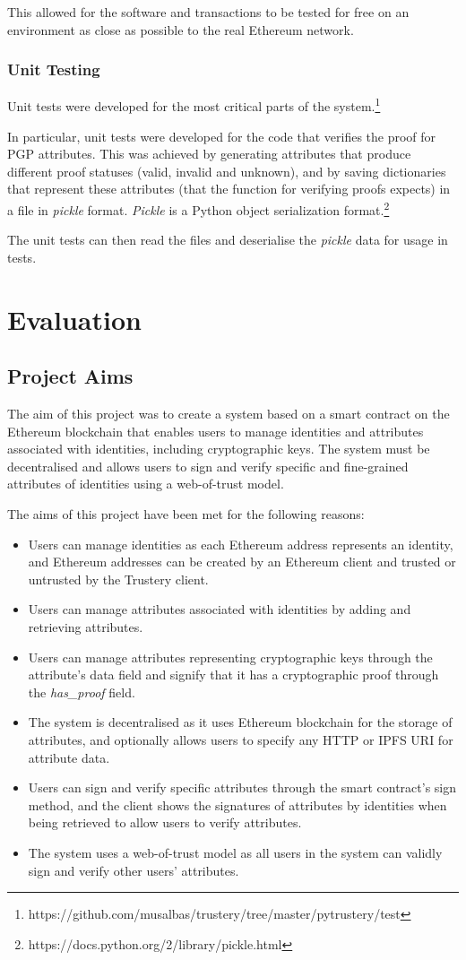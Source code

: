 \documentclass[12pt,a4paper]{report}
\begin{document}
	This allowed for the software and transactions to be tested for free on an environment as close as possible to the real Ethereum network.
	
	\subsection{Unit Testing}
	Unit tests were developed for the most critical parts of the system.\footnote{https://github.com/musalbas/trustery/tree/master/pytrustery/test}
	
	In particular, unit tests were developed for the code that verifies the proof for PGP attributes. This was achieved by generating attributes that produce different proof statuses (valid, invalid and unknown), and by saving dictionaries that represent these attributes (that the function for verifying proofs expects) in a file in \textit{pickle} format. \textit{Pickle} is a Python object serialization format.\footnote{https://docs.python.org/2/library/pickle.html}
	
	The unit tests can then read the files and deserialise the \textit{pickle} data for usage in tests.
	
	\chapter{Evaluation}
	\section{Project Aims}
	The aim of this project was to create a system based on a smart contract on the Ethereum blockchain that enables users to manage identities and attributes associated with identities, including cryptographic keys. The system must be decentralised and allows users to sign and verify specific and fine-grained attributes of identities using a web-of-trust model.
	
	The aims of this project have been met for the following reasons:
	\begin{itemize}
		\item Users can manage identities as each Ethereum address represents an identity, and Ethereum addresses can be created by an Ethereum client and trusted or untrusted by the Trustery client.
		\item Users can manage attributes associated with identities by adding and retrieving attributes.
		\item Users can manage attributes representing cryptographic keys through the attribute's data field and signify that it has a cryptographic proof through the \textit{has\_proof} field.
		\item The system is decentralised as it uses Ethereum blockchain for the storage of attributes, and optionally allows users to specify any HTTP or IPFS URI for attribute data.
		\item Users can sign and verify specific attributes through the smart contract's sign method, and the client shows the signatures of attributes by identities when being retrieved to allow users to verify attributes.
		\item The system uses a web-of-trust model as all users in the system can validly sign and verify other users' attributes.
	\end{itemize}
\end{document}
